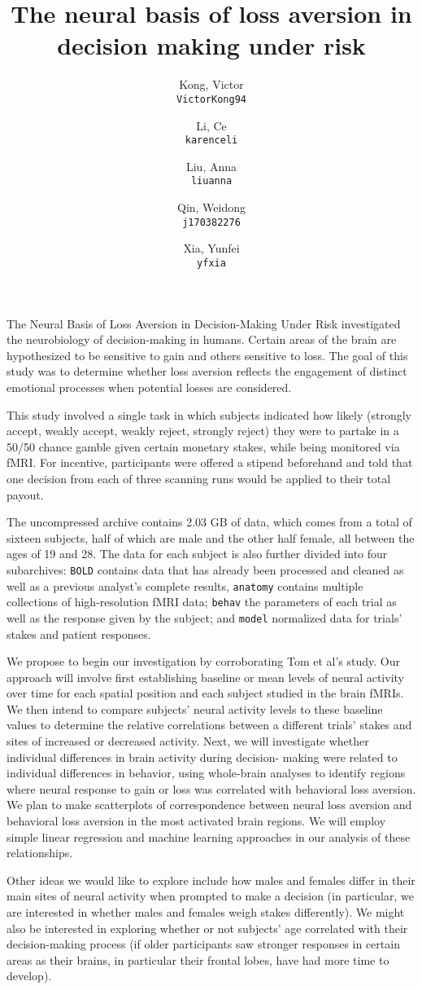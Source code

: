 \documentclass[11pt]{article}
\title{The neural basis of loss aversion in decision making under risk}
\author{
  Kong, Victor\\
  \texttt{VictorKong94}
  \and
  Li, Ce\\
  \texttt{karenceli}
  \and
  Liu, Anna\\
  \texttt{liuanna}
  \and
  Qin, Weidong\\
  \texttt{j170382276}
  \and
  Xia, Yunfei\\
  \texttt{yfxia}
}
\begin{document}
\maketitle

The Neural Basis of Loss Aversion in Decision-Making Under Risk
\cite{tom2007neural} investigated the neurobiology of decision-making in humans.
Certain areas of the brain are hypothesized to be sensitive to gain and others
sensitive to loss. The goal of this study was to determine whether loss aversion
reflects the engagement of distinct emotional processes when potential losses
are considered.

This study involved a single task in which subjects indicated
how likely (strongly accept, weakly accept, weakly reject, strongly reject) they
were to partake in a 50/50 chance gamble given certain monetary stakes, while
being monitored via fMRI. For incentive, participants were offered a stipend
beforehand and told that one decision from each of three scanning runs would be
applied to their total payout.

The uncompressed archive contains 2.03 GB of data, which comes from a total of
sixteen subjects, half of which are male and the other half female, all between
the ages of 19 and 28. The data for each subject is also further divided into
four subarchives: \texttt{BOLD} contains data that has already been processed
and cleaned as well as a previous analyst's complete results, \texttt{anatomy}
contains multiple collections of high-resolution fMRI data; \texttt{behav} the
parameters of each trial as well as the response given by the subject; and
\texttt{model} normalized data for trials' stakes and patient responses.

We propose to begin our investigation by corroborating Tom et al's study. Our
approach will involve first establishing baseline or mean levels of neural
activity over time for each spatial position and each subject studied in the
brain fMRIs. We then intend to compare subjects' neural activity levels to
these baseline values to determine the relative correlations between a different
trials' stakes and sites of increased or decreased activity. Next, we will
investigate whether individual differences in brain activity during decision-
making were related to individual differences in behavior, using whole-brain
analyses to identify regions where neural response to gain or loss was
correlated with behavioral loss aversion. We plan to make scatterplots of
correspondence between neural loss aversion and behavioral loss aversion in the
most activated brain regions. We will employ simple linear regression and
machine learning approaches in our analysis of these relationships.

Other ideas we would like to explore include how males and females differ in
their main sites of neural activity when prompted to make a decision (in
particular, we are interested in whether males and females weigh stakes
differently). We might also be interested in exploring whether or not subjects'
age correlated with their decision-making process (if older participants saw
stronger responses in certain areas as their brains, in particular their frontal
lobes, have had more time to develop).


\end{document}
